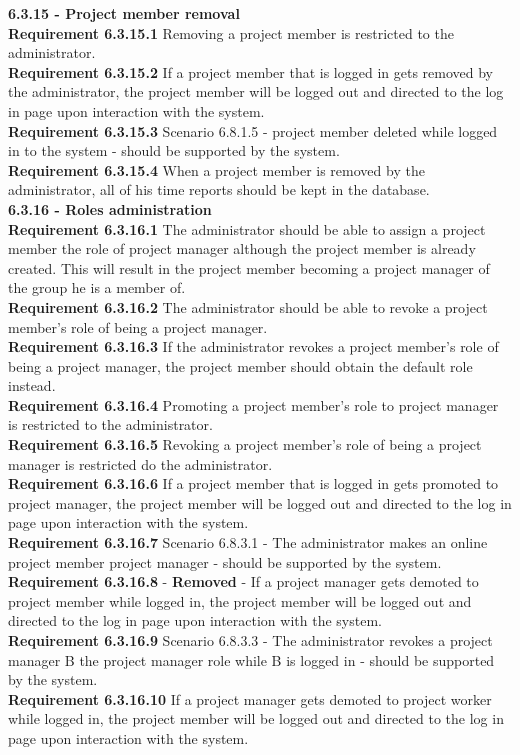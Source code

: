 \documentclass{article}
\begin{document}
{\fontsize{11}{11}\selectfont \noindent\textbf{6.3.15 - Project member removal}} \\
\noindent\textbf{Requirement 6.3.15.1} Removing a project member is restricted to the administrator. \\
\textbf{Requirement 6.3.15.2} If a project member that is logged in gets removed by the administrator, the project member will be logged out and directed to the log in page upon interaction with the system.\\
\textbf{Requirement 6.3.15.3} Scenario 6.8.1.5 - project member deleted while logged in to the system - should be supported by the system. \\
\textbf{Requirement 6.3.15.4} When a project member is removed by the administrator, all of his time reports should be kept in the database. \\

{\fontsize{11}{11}\selectfont \noindent\textbf{6.3.16 - Roles administration}} \\
\noindent\textbf{Requirement 6.3.16.1} The administrator should be able to assign a project member the role of project manager although the project member is already created. This will result in the project member becoming a project manager of the group he is a member of. \\
\noindent\textbf{Requirement 6.3.16.2} The administrator should be able to revoke a project member's role of being a project manager. \\
\noindent\textbf{Requirement 6.3.16.3} If the administrator revokes a project member's role of being a project manager, the project member should obtain the default role instead. \\
\noindent\textbf{Requirement 6.3.16.4} Promoting a project member's role to project manager is restricted to the administrator. \\
\noindent\textbf{Requirement 6.3.16.5} Revoking a project member's role of being a project manager is restricted do the administrator. \\
\noindent\textbf{Requirement 6.3.16.6} If a project member that is logged in gets promoted to project manager, the project member will be logged out and directed to the log in page upon interaction with the system.\\
\noindent\textbf{Requirement 6.3.16.7} Scenario 6.8.3.1 - The administrator makes an online project member project manager - should be supported by the system. \\
\textbf{Requirement 6.3.16.8} - \textbf{Removed} - If a project manager gets demoted to project member while logged in, the project member will be logged out and directed to the log in page upon interaction with the system.\\
\textbf{Requirement 6.3.16.9} Scenario 6.8.3.3 - The administrator revokes a project manager B the project manager role while B is logged in - should be supported by the system. \\
\textbf{Requirement 6.3.16.10} If a project manager gets demoted to project worker while logged in, the project member will be logged out and directed to the log in page upon interaction with the system.\\
\end{document}
